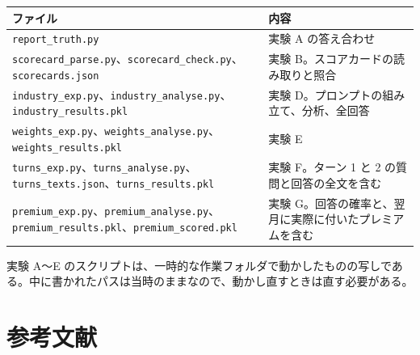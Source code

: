 \documentclass[xelatex,ja=standard,jafont=hiragino-pron,a4paper,10pt]{bxjsreport}
\newcommand{\code}[1]{\texttt{#1}}
\begin{document}
\begin{longtable}{p{6.40cm}p{8.00cm}}
\toprule
\textbf{ファイル} & \textbf{内容} \\
\midrule
\endfirsthead
\bottomrule
\endfoot
\code{report\_truth.py} & 実験 A の答え合わせ \\
\code{scorecard\_parse.py}、\code{scorecard\_check.py}、\code{scorecards.json} & 実験 B。スコアカードの読み取りと照合 \\
\code{industry\_exp.py}、\code{industry\_analyse.py}、\code{industry\_results.pkl} & 実験 D。プロンプトの組み立て、分析、全回答 \\
\code{weights\_exp.py}、\code{weights\_analyse.py}、\code{weights\_results.pkl} & 実験 E \\
\code{turns\_exp.py}、\code{turns\_analyse.py}、\code{turns\_texts.json}、\code{turns\_results.pkl} & 実験 F。ターン 1 と 2 の質問と回答の全文を含む \\
\code{premium\_exp.py}、\code{premium\_analyse.py}、\code{premium\_results.pkl}、\code{premium\_scored.pkl} & 実験 G。回答の確率と、翌月に実際に付いたプレミアムを含む \\
\end{longtable}

実験 A〜E のスクリプトは、一時的な作業フォルダで動かしたものの写しである。中に書かれたパスは当時のままなので、動かし直すときは直す必要がある。

\chapter*{参考文献}
\end{document}
